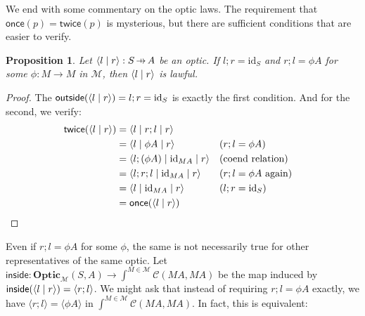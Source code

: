 \documentclass[11pt,letterpaper]{article}
\theoremstyle{plain}
\newtheorem{proposition}[theorem]{Proposition}
\theoremstyle{definition}
\newcommand{\C}{\mathscr{C}}
\newcommand{\M}{\mathscr{M}}
\newcommand{\Optic}{\mathbf{Optic}}
\newcommand{\id}{\mathrm{id}}
\newcommand{\rep}[2]{{\ensuremath \left\langle #1 \mid #2 \right\rangle}}
\newcommand{\repthree}[3]{{\ensuremath \langle #1 \mid #2 \mid #3 \rangle}}
\newcommand{\inside}{\mathsf{inside}}
\newcommand{\outside}{\mathsf{outside}}
\newcommand{\once}{\mathsf{once}}
\newcommand{\twice}{\mathsf{twice}}
\newcommand{\hto}{\ensuremath{\,\mathaccent\shortmid\rightarrow\,}}
\begin{document}
We end with some commentary on the optic laws. The requirement that $\once(p) = \twice(p)$ is mysterious, but there are sufficient conditions that are easier to verify.

\begin{proposition}
  Let $\rep{l}{r} : S \hto A$ be an optic. If $l;r = \id_S$ and $r;l = \phi A$ for some $\phi : M \to M$ in $\M$, then $\rep{l}{r}$ is lawful.
\end{proposition}
\begin{proof}
  The $\outside(\rep{l}{r}) = l;r = \id_S$ is exactly the first condition. And for the second, we verify:
  \begin{align*}
    \twice(\rep{l}{r})
    &= \repthree{l}{r;l}{r} \\
    &= \repthree{l}{\phi A}{r} && \text{($r;l = \phi A$)}\\
    &= \repthree{l ; (\phi A)}{\id_{MA}}{r} && \text{(coend relation)} \\
    &= \repthree{l;r;l}{\id_{MA}}{r} && \text{($r;l = \phi A$ again)}\\
    &= \repthree{l}{\id_{MA}}{r}  && \text{($l;r = \id_S$)}\\
    &= \once(\rep{l}{r})
  \end{align*}
\end{proof}

Even if $r;l = \phi A$ for some $\phi$, the same is not necessarily true for other representatives of the same optic. Let $\inside : \Optic_\M(S, A) \to \int^{M \in \M} \C(M A, M A)$ be the map induced by $\inside(\rep{l}{r}) = \langle r ; l \rangle$. We might ask that instead of requiring $r;l = \phi A$ exactly, we have $\langle r ; l \rangle = \langle \phi A \rangle$ in $\int^{M \in \M} \C(M A, M A)$. In fact, this is equivalent:
\end{document}
